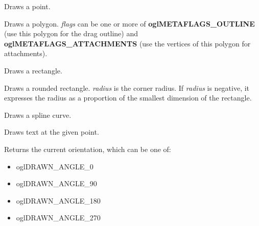 Draws a point.

\label{wxdrawnshapedrawpolygon}


Draws a polygon. {\it flags} can be one or more of {\bf oglMETAFLAGS\_OUTLINE} (use this polygon for the drag outline)
and {\bf oglMETAFLAGS\_ATTACHMENTS} (use the vertices of this polygon for attachments).

\label{wxdrawnshapedrawrectangle}


Draws a rectangle.

\label{wxdrawnshapedrawroundedrectangle}


Draws a rounded rectangle. {\it radius} is the corner radius. If {\it radius} is negative,
it expresses the radius as a proportion of the smallest dimension of the rectangle.

\label{wxdrawnshapedrawspline}


Draws a spline curve.

\label{wxdrawnshapedrawtext}


Draws text at the given point.

\label{wxdrawnshapegetangle}


Returns the current orientation, which can be one of:

\begin{itemize}\itemsep=0pt
\item oglDRAWN\_ANGLE_0
\item oglDRAWN\_ANGLE_90
\item oglDRAWN\_ANGLE_180
\item oglDRAWN\_ANGLE_270
\end{itemize}

